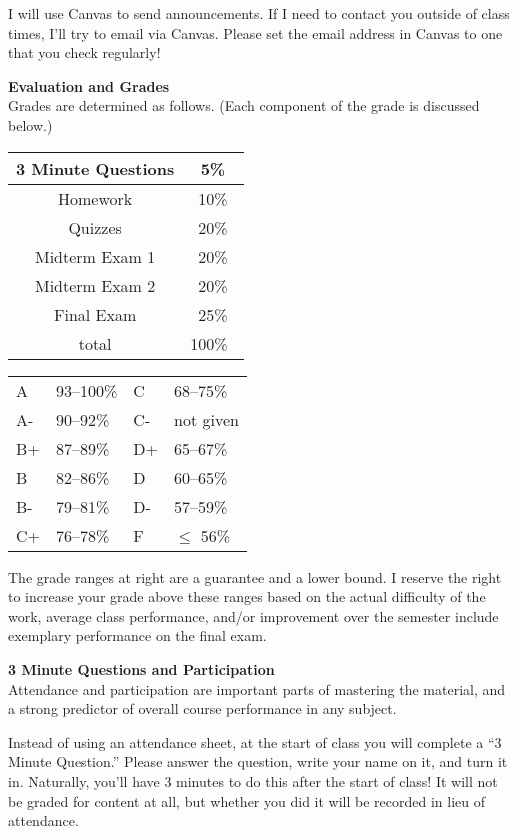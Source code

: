 \documentclass[12pt]{article}
\renewcommand{\emph}[1]{\textsf{\textbf{#1}}}
\newcommand{\localhead}[1]{\par\smallskip\textbf{#1} \smallskip\nobreak\\}%
\def\heading#1{\localhead{\large\emph{#1}}}
\begin{document}
I will use Canvas to send announcements.  If I need to contact you outside of class times, I'll try to email via Canvas.  Please set the email address in Canvas to one that you check regularly!


\heading{Evaluation and Grades}
Grades are determined as follows.  (Each component of the grade is discussed below.)
 
\begin{multicols}{2}
\begin{tabular}{|c|c|}
\hline
3 Minute Questions & 5\%\\
\hline
Homework & 10\% \\
\hline
Quizzes & 20\% \\
\hline
Midterm Exam 1 & 20\% \\
\hline
Midterm Exam 2 & 20\%  \\
\hline
Final Exam & 25\% \\
\hline
total & 100\% \, \\
\hline
\end{tabular}


\begin{tabular}{llll}
A  & 93--100\%& C  & 68--75\%  \\
A- & 90--92\% & C- & not given \\
B+ & 87--89\% & D+ & 65--67\%  \\
B  & 82--86\% & D  & 60--65\%  \\
B- & 79--81\% & D- & 57--59\%  \\
C+ & 76--78\% & F  & $\le$ 56\%
\end{tabular}
\end{multicols}

The grade ranges at right are a guarantee and a lower bound. I reserve the right to increase your grade above these ranges based on the actual difficulty of the work, average class performance, and/or improvement over the semester include exemplary performance on the final exam. 

\heading{3 Minute Questions and Participation}
Attendance and participation are important parts of mastering the material, and a strong predictor of overall course performance in any subject.

Instead of using an attendance sheet, at the start of class you will complete a ``3 Minute Question.''  Please answer the question, write your name on it, and turn it in.  Naturally, you'll have 3 minutes to do this after the start of class!  It will not be graded for content at all, but whether you did it will be recorded in lieu of attendance.
\end{document}
